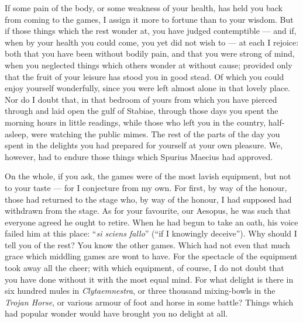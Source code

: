 

 If some pain of the body, or some weakness of your health, has held you back from coming to the games, I assign it more to fortune than to your wisdom. But if those things which the rest wonder at, you have judged contemptible — and if, when by your health you could come, you yet did not wish to — at each I rejoice: both that you have been without bodily pain, and that you were strong of mind, when you neglected things which others wonder at without cause; provided only that the fruit of your leisure has stood you in good stead. Of which you could enjoy yourself wonderfully, since you were left almost alone in that lovely place. Nor do I doubt that, in that bedroom of yours from which you have pierced through and laid open the gulf of Stabiae, through those days you spent the morning hours in little readings, while those who left you in the country, half-asleep, were watching the public mimes. The rest of the parts of the day you spent in the delights you had prepared for yourself at your own pleasure. We, however, had to endure those things which Spurius Maecius had approved.

 On the whole, if you ask, the games were of the most lavish equipment, but not to your taste — for I conjecture from my own. For first, by way of the honour, those had returned to the stage who, by way of the honour, I had supposed had withdrawn from the stage. As for your favourite, our Aesopus, he was such that everyone agreed he ought to retire. When he had begun to take an oath, his voice failed him at this place: ``\textit{si sciens fallo}'' (``if I knowingly deceive''). Why should I tell you of the rest? You know the other games. Which had not even that much grace which middling games are wont to have. For the spectacle of the equipment took away all the cheer; with which equipment, of course, I do not doubt that you have done without it with the most equal mind. For what delight is there in six hundred mules in \textit{Clytaemnestra}, or three thousand mixing-bowls in the \textit{Trojan Horse}, or various armour of foot and horse in some battle? Things which had popular wonder would have brought you no delight at all.

